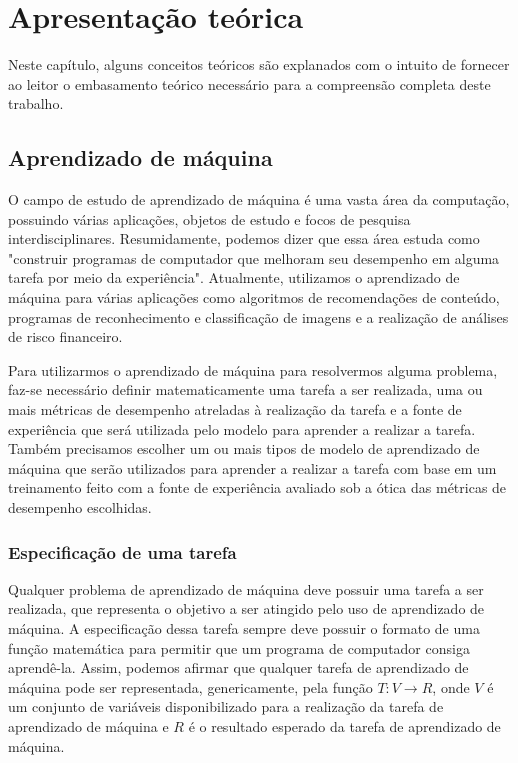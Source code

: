\chapter{Apresentação teórica} \label{chap:apresentacao_teorica}

Neste capítulo, alguns conceitos teóricos são explanados com o intuito de fornecer ao leitor o embasamento teórico necessário para a compreensão completa deste trabalho.

\section{Aprendizado de máquina}

O campo de estudo de aprendizado de máquina é uma vasta área da computação, possuindo várias aplicações, objetos de estudo e focos de pesquisa interdisciplinares. Resumidamente, podemos dizer que essa área estuda como "construir programas de computador que melhoram seu desempenho em alguma tarefa por meio da experiência"\cite[p.29]{machine_learning}. Atualmente, utilizamos o aprendizado de máquina para várias aplicações como algoritmos de recomendações de conteúdo, programas de reconhecimento e classificação de imagens e a realização de análises de risco financeiro.

Para utilizarmos o aprendizado de máquina para resolvermos alguma problema, faz-se necessário definir matematicamente uma tarefa a ser realizada, uma ou mais métricas de desempenho atreladas à realização da tarefa e a fonte de experiência que será utilizada pelo modelo para aprender a realizar a tarefa.\cite[p.29]{machine_learning} Também precisamos escolher um ou mais tipos de modelo de aprendizado de máquina que serão utilizados para aprender a realizar a tarefa com base em um treinamento feito com a fonte de experiência avaliado sob a ótica das métricas de desempenho escolhidas.

\subsection{Especificação de uma tarefa}

Qualquer problema de aprendizado de máquina deve possuir uma tarefa a ser realizada, que representa o objetivo a ser atingido pelo uso de aprendizado de máquina. A especificação dessa tarefa sempre deve possuir o formato de uma função matemática para permitir que um programa de computador consiga aprendê-la. Assim, podemos afirmar que qualquer tarefa de aprendizado de máquina pode ser representada, genericamente, pela função $T : V \rightarrow R$, onde $V$ é um conjunto de variáveis disponibilizado para a realização da tarefa de aprendizado de máquina e $R$ é o resultado esperado da tarefa de aprendizado de máquina.

